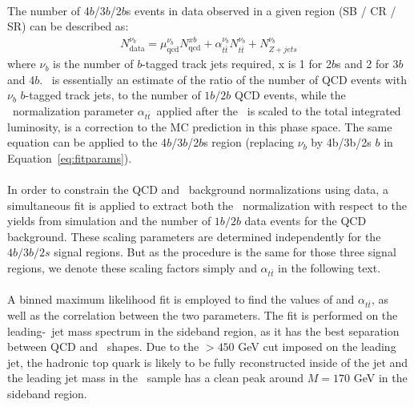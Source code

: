 \paragraph{}
The number of 4$b$/3$b$/2$b$s events in data observed in a given region (SB / CR / SR) can be described as:
\begin{eqnarray}\label{eq:fitparams}
N^{\nu_b}_{\text{data}} = \mu_{\text{qcd}}^{\nu_b} N^{xb}_{\text{qcd}} + \alpha_{t\bar{t}}^{\nu_b} N^{\nu_b}_{t\bar{t}} + N^{\nu_b}_{Z+jets}
\end{eqnarray}
where $\nu_b$ is the number of $b$-tagged track jets required, x is 1 for 2$b$s and 2 for 3$b$ and 4$b$. \muqcd\ is essentially an estimate of the ratio of the number of  QCD events with $\nu_b$ $b$-tagged track jets, to the number of $1b/2b$ QCD events, while the \ttbar\ normalization parameter $\alpha_{t\bar{t}}$\, applied after the \ttbar\ is scaled to the total integrated luminosity, is a correction to the MC prediction in this phase space. The same equation can be applied to the 4$b$/3$b$/2$b$s region (replacing $\nu_b$ by 4b/3b/2s $b$ in Equation~\ref{eq:fitparams}).   

\paragraph{}
In order to constrain the QCD and \ttbar\ background normalizations using data, a simultaneous fit is applied to extract both the \ttbar\ normalization with respect to the yields from simulation and the number of $1b/2b$ data events for the QCD background.  These scaling parameters are determined independently for the $4b/3b/2s$ signal regions. But as the procedure is the same for those three signal regions, we denote these scaling factors simply \muqcd and $\alpha_{t\bar{t}}$ in the following text.

\paragraph{}
A binned maximum likelihood fit is employed to find the values of \muqcd and $\alpha_{t\bar{t}}$, as well as the correlation between the two parameters. The fit is performed on the leading-\pt\ jet mass spectrum in the sideband region, as it has the best separation between QCD and \ttbar\ shapes. Due to the \pt$>450$ GeV cut imposed on the leading \largeR jet, the hadronic top quark is likely to be fully reconstructed inside of the \largeR jet and the leading jet mass in the \ttbar\ sample has a clean peak around $M=170$ GeV in the sideband region.

